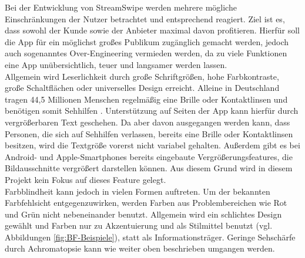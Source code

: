 
Bei der Entwicklung von StreamSwipe werden mehrere mögliche Einschränkungen der Nutzer betrachtet und entsprechend reagiert. Ziel ist es, dass sowohl der Kunde sowie der Anbieter maximal davon profitieren. Hierfür soll die App für ein möglichst großes Publikum zugänglich gemacht werden, jedoch auch sogenanntes Over-Engineering vermieden werden, da zu viele Funktionen eine App unübersichtlich, teuer und langsamer werden lassen.\\

\noindent
Allgemein wird Leserlichkeit durch große Schriftgrößen, hohe Farbkontraste, große Schaltflächen oder universelles Design erreicht. Alleine in Deutschland tragen 44,5 Millionen Menschen regelmäßig eine Brille oder Kontaktlinsen und benötigen somit Sehhilfen \cite{sehhilfen}. Unterstützung auf Seiten der App kann hierfür durch vergrößerbaren Text geschehen. Da aber davon ausgegangen werden kann, dass Personen, die sich auf Sehhilfen verlassen, bereits eine Brille oder Kontaktlinsen besitzen, wird die Textgröße vorerst nicht variabel gehalten. Außerdem gibt es bei Android- und Apple-Smartphones bereits eingebaute Vergrößerungsfeatures, die Bildausschnitte vergrößert darstellen können. Aus diesem Grund wird in diesem Projekt kein Fokus auf dieses Feature gelegt. \\
Farbblindheit kann jedoch in vielen Formen auftreten. Um der bekannten Farbfehlsicht entgegenzuwirken, werden Farben aus Problembereichen wie Rot und Grün nicht nebeneinander benutzt. Allgemein wird ein schlichtes Design gewählt und Farben nur zu Akzentuierung und als Stilmittel benutzt (vgl. Abbildungen \ref{fig:BF-Beispiele}), statt als Informationsträger.  Geringe Sehschärfe durch Achromatopsie kann wie weiter oben beschrieben umgangen werden.\\


